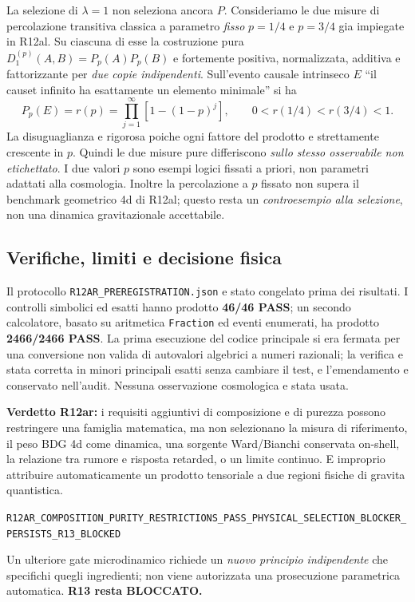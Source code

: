 \documentclass[11pt,a4paper]{article}
\begin{document}
La selezione di $\lambda=1$ non seleziona ancora $P$. Consideriamo le
due misure di percolazione transitiva classica a parametro \emph{fisso}
$p=1/4$ e $p=3/4$ gia impiegate in R12al. Su ciascuna di esse la
costruzione pura $D_1^{(p)}(A,B)=P_p(A)P_p(B)$ e fortemente positiva,
normalizzata, additiva e fattorizzante per \emph{due copie indipendenti}.
Sull'evento causale intrinseco $E$ ``il causet infinito ha esattamente
un elemento minimale'' si ha
\begin{equation}
 P_p(E)=r(p)=\prod_{j=1}^{\infty}\left[1-(1-p)^j\right],
 \qquad 0<r(1/4)<r(3/4)<1.
\end{equation}
La disuguaglianza e rigorosa poiche ogni fattore del prodotto e
strettamente crescente in $p$. Quindi le due misure pure differiscono
\emph{sullo stesso osservabile non etichettato}. I due valori $p$ sono
esempi logici fissati a priori, non parametri adattati alla cosmologia.
Inoltre la percolazione a $p$ fissato non supera il benchmark geometrico
4d di R12al; questo resta un \emph{controesempio alla selezione}, non
una dinamica gravitazionale accettabile.

\subsection{Verifiche, limiti e decisione fisica}

Il protocollo \texttt{R12AR\_PREREGISTRATION.json} e stato congelato
prima dei risultati. I controlli simbolici ed esatti hanno prodotto
\textbf{46/46 PASS}; un secondo calcolatore, basato su aritmetica
\texttt{Fraction} ed eventi enumerati, ha prodotto \textbf{2466/2466
PASS}. La prima esecuzione del codice principale si era fermata per
una conversione non valida di autovalori algebrici a numeri razionali;
la verifica e stata corretta in minori principali esatti senza cambiare
il test, e l'emendamento e conservato nell'audit. Nessuna osservazione
cosmologica e stata usata.

\textbf{Verdetto R12ar:} i requisiti aggiuntivi di composizione e di
purezza possono restringere una famiglia matematica, ma non selezionano
la misura di riferimento, il peso BDG 4d come dinamica, una sorgente
Ward/Bianchi conservata on-shell, la relazione tra rumore e risposta
retarded, o un limite continuo. E improprio attribuire automaticamente
un prodotto tensoriale a due regioni fisiche di gravita quantistica.
\begin{center}\small
 \nolinkurl{R12AR_COMPOSITION_PURITY_RESTRICTIONS_PASS_PHYSICAL_SELECTION_BLOCKER_PERSISTS_R13_BLOCKED}
\end{center}
Un ulteriore gate microdinamico richiede un \emph{nuovo principio
indipendente} che specifichi quegli ingredienti; non viene autorizzata
una prosecuzione parametrica automatica. \textbf{R13 resta BLOCCATO.}
\end{document}
